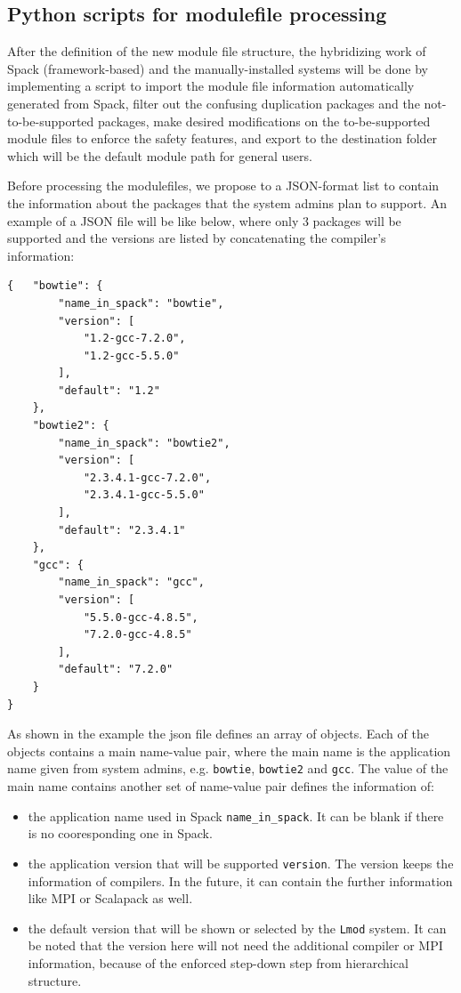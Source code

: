 \documentclass[conference]{IEEEtran}
\begin{document}
\subsection{Python scripts for modulefile processing}\label{subsec_modulefile_processing}

After the definition of the new module file structure, the hybridizing work of Spack (framework-based) and the manually-installed systems will be done by implementing a script to import the module file information automatically generated from Spack, filter out the confusing duplication packages and the not-to-be-supported packages, make desired modifications on the to-be-supported module files to enforce the safety features, and export to the destination folder which will be the default module path for general users.

Before processing the modulefiles, we propose to a JSON-format list to contain the information about the packages that the system admins plan to support. An example of a JSON file will be like below, where only 3 packages will be supported and the versions are listed by concatenating the compiler's information:

\begin{verbatim}
{   "bowtie": {
        "name_in_spack": "bowtie",
        "version": [
            "1.2-gcc-7.2.0",
            "1.2-gcc-5.5.0"
        ],
        "default": "1.2"
    },
    "bowtie2": {
        "name_in_spack": "bowtie2",
        "version": [
            "2.3.4.1-gcc-7.2.0",
            "2.3.4.1-gcc-5.5.0"
        ],
        "default": "2.3.4.1"
    },
    "gcc": {
        "name_in_spack": "gcc",
        "version": [
            "5.5.0-gcc-4.8.5",
            "7.2.0-gcc-4.8.5"
        ],
        "default": "7.2.0"
    }
}
\end{verbatim}

As shown in the example the json file defines an array of objects. Each of the objects contains a main name-value pair, where the main name is the application name given from system admins, e.g. \verb|bowtie|, \verb|bowtie2| and \verb|gcc|. The value of the main name contains another set of name-value pair defines the information of: 

\begin{itemize}
    \item the application name used in Spack \verb|name_in_spack|. It can be blank if there is no cooresponding one in Spack.
    \item the application version that will be supported \verb|version|. The version keeps the information of compilers. In the future, it can contain the further information like MPI or Scalapack as well.
    \item the default version that will be shown or selected by the \verb|Lmod| system. It can be noted that the version here will not need the additional compiler or MPI information, because of the enforced step-down step from hierarchical structure. 
\end{itemize}
\end{document}
